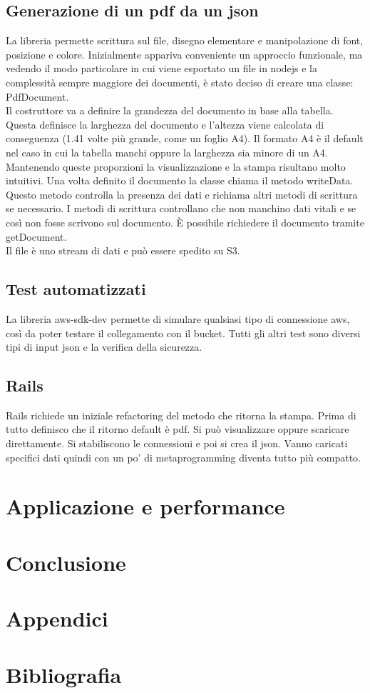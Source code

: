 \documentclass[12pt]{article}
\begin{document}
\subsection{Generazione di un pdf da un json}
La libreria permette scrittura sul file, disegno elementare e manipolazione di 
font, posizione e colore.
Inizialmente appariva conveniente un approccio funzionale, ma vedendo il modo 
particolare in cui viene esportato un file in nodejs e la complessità sempre 
maggiore dei documenti, è stato deciso di creare una classe: PdfDocument. 
\\
Il costruttore va a definire la grandezza del documento in base alla tabella.
Questa definisce la larghezza del documento e l'altezza viene calcolata di
conseguenza (1.41 volte più grande, come un foglio A4).
Il formato A4 è il default nel caso in cui la tabella manchi oppure la larghezza 
sia minore di un A4. 
Mantenendo queste proporzioni la visualizzazione e la stampa risultano molto 
intuitivi. 
Una volta definito il documento la classe chiama il metodo writeData. 
Questo metodo controlla la presenza dei dati e richiama altri metodi di scrittura 
se necessario.
I metodi di scrittura controllano che non manchino dati vitali e se così non fosse 
scrivono sul documento. 
È possibile richiedere il documento tramite getDocument. 
\\ 
Il file è uno stream di dati e può essere spedito su S3. 

\subsection{Test automatizzati}
La libreria aws-sdk-dev permette di simulare qualsiasi tipo di connessione aws, 
così da poter testare il collegamento con il bucket. 
Tutti gli altri test sono diversi tipi di input json e la verifica della sicurezza.

\subsection{Rails}
Rails richiede un iniziale refactoring del metodo che ritorna la stampa. Prima di 
tutto definisco che il ritorno default è pdf. Si può visualizzare oppure scaricare 
direttamente. Si stabiliscono le connessioni e poi si crea il json. Vanno caricati 
specifici dati quindi con un po' di metaprogramming diventa tutto più compatto. 

\section{Applicazione e performance}
\section{Conclusione}
\section{Appendici}
\section{Bibliografia}
\end{document}
